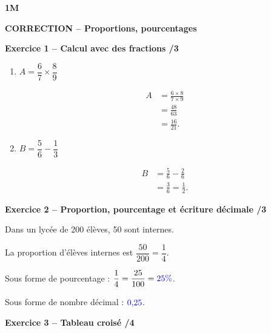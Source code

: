 \documentclass[10pt,a4paper]{article}
\renewcommand{\niveau}{1M}
\renewcommand{\chapitre}{Proportions, pourcentages}
\renewcommand{\interroversion}[1]{
    \noindent\textbf{\niveau}

    \vspace{-0.5cm}
    \begin{center}
        \textbf{\large CORRECTION -- \chapitre}
    \end{center}

    \vspace{0.1cm}
}
\begin{document}

\interroversion{A}

\textbf{Exercice 1 -- Calcul avec des fractions \hfill /3}

\begin{enumerate}
\item \(A = \dfrac{6}{7}\times\dfrac{8}{9}\)

\[
\begin{aligned}
A &= \frac{6\times8}{7\times9}\\
  &= \frac{48}{63}\\
  &= \frac{16}{21}.
\end{aligned}
\]

\item \(B = \dfrac{5}{6}-\dfrac{1}{3}\)

\[
\begin{aligned}
B &= \frac{5}{6}-\frac{2}{6}\\
  &= \frac{3}{6}=\frac{1}{2}.
\end{aligned}
\]
\end{enumerate}

\textbf{Exercice 2 -- Proportion, pourcentage et écriture décimale \hfill /3}

Dans un lycée de 200 élèves, 50 sont internes.

La proportion d'élèves internes est \(\dfrac{50}{200}=\dfrac{1}{4}\).

Sous forme de pourcentage : \(\dfrac{1}{4}=\dfrac{25}{100}=\textcolor{blue}{25\%}\).

Sous forme de nombre décimal : \(\textcolor{blue}{0{,}25}\).

\textbf{Exercice 3 -- Tableau croisé \hfill /4}
\end{document}
